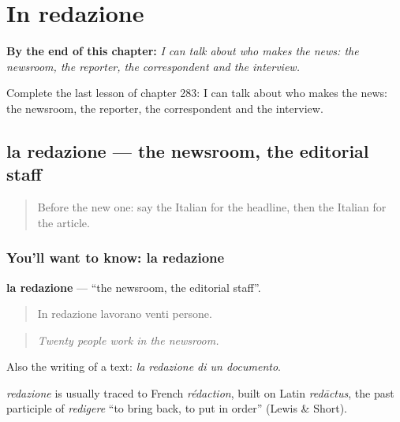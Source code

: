 
\chapter{In redazione}
\label{ch:it-in-redazione}

\begin{chapteropening}
\textbf{By the end of this chapter:} \emph{I can talk about who makes the news: the newsroom, the reporter, the correspondent and the interview.}

Complete the last lesson of chapter 283: I can talk about who makes the news: the newsroom, the reporter, the correspondent and the interview.
\end{chapteropening}

\section[la redazione]{la redazione — the newsroom, the editorial staff}

\label{lesson:IT-C283-redazione}



\begin{quote}
Before the new one: say the Italian for the headline, then the Italian for the article.
\end{quote}

\subsection*{You'll want to know: la redazione}
\textbf{la redazione} — \textquotedblleft{}the newsroom, the editorial staff\textquotedblright{}.

\begin{quote}
In redazione lavorano venti persone.
\end{quote}

\begin{quote}
\emph{Twenty people work in the newsroom.}
\end{quote}

Also the writing of a text: \emph{la redazione di un documento}.

\begin{cousinweb}
\emph{redazione} is usually traced to French \emph{rédaction}, built on Latin \emph{redāctus}, the past participle of \emph{redigere} \textquotedblleft{}to bring back, to put in order\textquotedblright{} (Lewis \& Short).
\end{cousinweb}


